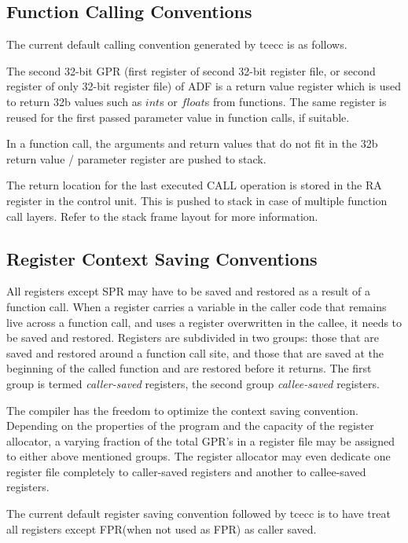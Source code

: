 \documentclass[twoside]{tceusermanual}
\begin{document}
\subsection{Function Calling Conventions}
\label{ssec:calling-conventions}

The current default calling convention generated by tcecc is as follows.

The second 32-bit GPR (first register of second 32-bit register file,
or second register of only 32-bit register file) of ADF
is a return value register which is used to return 
32b values such as $int$s or $float$s from functions. 
The same register is reused for the first 
passed parameter value in function calls, if suitable. 

In a function call, the arguments and return values that do not fit 
in the 32b return value / parameter register are pushed to stack.

The return location for the last executed CALL operation is 
stored in the RA register in the control unit. This is pushed 
to stack in case of multiple function call layers. Refer to the 
stack frame layout for more information.


\subsection{Register Context Saving Conventions}
\label{ssec:register-conventions}

All registers except SPR may have to be saved and restored as a result of a
function call.  When a register carries a variable in the caller code that
remains live across a function call, and uses a register overwritten in the callee, 
it needs to be saved and restored.  Registers are subdivided in two groups:
those that are saved and restored around a function call site, and those that are
saved at the beginning of the called function and are restored before it 
returns. The first group is termed \textit{caller-saved} registers, the second 
group \textit{callee-saved} registers.

The compiler has the freedom to optimize the context saving convention.
Depending on the properties of the program and the capacity of the register
allocator, a varying fraction of the total GPR's in a register file may be
assigned to either above mentioned groups.  The register allocator may even 
dedicate one register file completely to caller-saved registers and another 
to callee-saved registers.

The current default register saving convention followed by tcecc is to have 
treat all registers except FPR(when not used as FPR) as caller saved.
\end{document}
